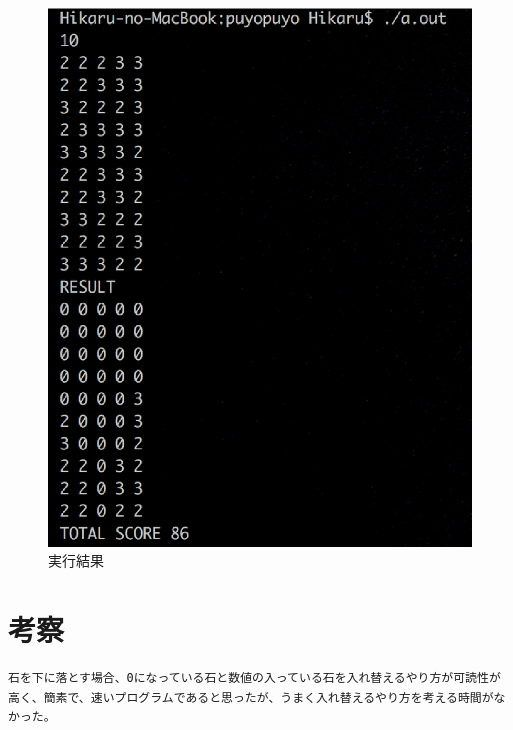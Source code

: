 \documentclass{jarticle}
\begin{document}
\begin{figure}[!h]
\begin{center}
\includegraphics[scale=0.57]{c_result3.eps}
\end{center}
\caption{実行結果}
\end{figure}

\newpage
\section{考察}
\begin{verbatim}
石を下に落とす場合、0になっている石と数値の入っている石を入れ替えるやり方が可読性が高く、簡素で、速いプログラムであると思ったが、うまく入れ替えるやり方を考える時間がなかった。
\end{verbatim}
\end{document}
